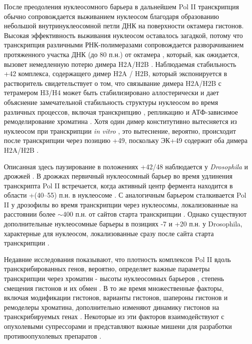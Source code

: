     После преодоления нуклеосомного барьера в дальнейшем Pol II транскрипция обычно сопровождается выживанием нуклеосом благодаря образованию небольшой внутринуклеосомной петли ДНК на поверхности октамера гистонов. Высокая эффективность выживания нуклеосом оставалось загадкой, потому что транскрипция различными РНК-полимеразами сопровождается разворачиванием протяженного участка ДНК (до 80 п.н.) от октамера \cite{kulaeva_mechanism_2009,chang_structural_2013,bednar_nature_1999}, который, как ожидается, вызовет немедленную потерю димера H2A/H2B \cite{feng_lifetime_1993}. Наблюдаемая стабильность +42 комплекса, содержащего димер H2A / H2B, который экспонируется в растворитель свидетельствует о том, что связывание димера H2A/H2B с тетрамером H3/H4 может быть стабилизировано аллостерически и дает объяснение замечательной стабильность структуры нуклеосом во время различных процессов, включая транскрипцию \cite{kulaeva_mechanism_2009}, репликацию \cite{randall_fate_1992} и АТФ-зависимое ремоделирование хроматина \cite{mueller-planitz_nucleosome_2013}. Хотя один димер конститутивно вытесняется из нуклеосом при транскрипции \textit{in vitro} \cite{kireeva_nucleosome_2002}, это вытеснение, вероятно, происходит после транскрипции через позицию +49, поскольку ЭК+49 содержит оба димера H2A/H2B \cite{churchman_nascent_2011}.
    
    Описанная здесь паузирование в положениях +42/48 наблюдается у \textit{Drosophila} \cite{weber_nucleosomes_2014} и дрожжей \cite{churchman_nascent_2011}. В дрожжах первичный нуклеосомный барьер во время удлинения транскрипта  Pol II встречается, когда активный центр фермента находится в области +(40–55) п.н. в нуклеосоме . С аналогичным барьером сталкивается Pol II у дрозофилы во время транскрипции через нуклеосомы, локализованные на расстоянии более $\sim$400 п.н. от сайтов старта транскрипции \cite{weber_nucleosomes_2014}. Однако существуют дополнительные нуклеосомные барьеры в позициях -7 и +20 п.н. у Drosophila, характерные для нуклеосом, локализованные сразу после сайта старта транскрипции \cite{weber_nucleosomes_2014}.
    
    Недавние исследования показывают, что плотность комплексов Pol II вдоль транскрибированных генов, вероятно, определяет важные параметры транскрипции через хроматин - высоты нуклеосомных барьеров \cite{kulaeva_rna_2010,jin_synergistic_2010,chang_analysis_2014}, степень смещения гистонов и их обмен \cite{lee_evidence_2004,kulaeva_rna_2010,dion_dynamics_2007,rufiange_genome-wide_2007}. В то же время множественные факторы, включая модификации гистонов, варианты гистонов, шапероны гистонов и ремоделеры хроматина, дополнительно изменяют динамику гистонов на транскрибируемых генах \cite{smolle_resetting_2013,das_histone_2013,zentner_regulation_2013,weber_histone_2014}. Некоторые из эти факторов взаимодействуют с опухолевыми супрессорами \cite{wen_zmynd11_2014} и представляют важные мишени для разработки противоопухолевых препаратов \cite{garcia_facilitates_2013}.
    
    
    
    
    
    
    
    
    
    
    
    
    
    
    
    
    
    
    
    
    
    
    
    
    
